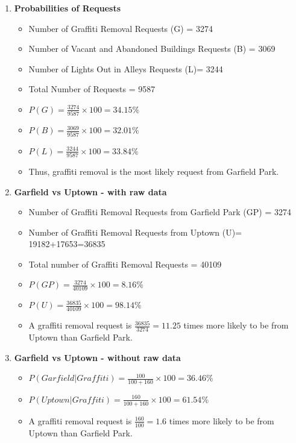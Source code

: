 \documentclass[letterpaper,12pt]{article}
\begin{document}
\begin{enumerate}[label = \Alph*]
\item \textbf{Probabilities of Requests}
\begin{itemize}
\item Number of Graffiti Removal Requests (G) = 3274
\item Number of Vacant and Abandoned Buildings Requests (B) = 3069
\item Number of Lights Out in Alleys Requests (L)= 3244
\item Total Number of Requests = 9587
\item $P(G) = \frac{3274}{9587} \times 100 = 34.15\%$
\item $P(B) = \frac{3069}{9587} \times 100 = 32.01\%$
\item $P(L) = \frac{3244}{9587} \times 100 = 33.84\%$
\item Thus, graffiti removal is the most likely request from Garfield Park.
\end{itemize}

\item \textbf{Garfield vs Uptown - with raw data}
\begin{itemize}
\item Number of Graffiti Removal Requests from Garfield Park (GP) = 3274
\item Number of Graffiti Removal Requests from Uptown (U)= 19182+17653=36835
\item Total number of Graffiti Removal Requests = 40109
\item $P(GP) = \frac{3274}{40109} \times 100 = 8.16 \%$
\item $P(U) = \frac{36835}{40109} \times 100 = 98.14 \%$
\item A graffiti removal request is $\frac{36835}{3274} = 11.25$ times more likely to be from Uptown than Garfield Park.
\end{itemize}

\item \textbf{Garfield vs Uptown - without raw data}
\begin{itemize}
\item $P(Garfield | Graffiti) = \frac{100}{100+160} \times 100 = 36.46 \%$
\item $P(Uptown | Graffiti) = \frac{160}{100+160} \times 100 =61.54 \%$
\item A graffiti removal request is $\frac{160}{100} = 1.6$ times more likely to be from Uptown than Garfield Park.
\end{itemize}

\end{enumerate}
\end{document}
